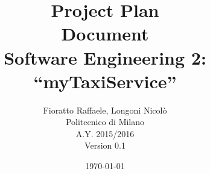 \begin{figure}
  \centering
	\def\svgwidth{\columnwidth}
    \resizebox{0.66\textwidth}{!}{}
\end{figure}
\title{{\Huge \textbf{P}roject \textbf{P}lan \\ \textbf{D}ocument}\\{\Large Software Engineering 2: ``myTaxiService''}}

\author{Fioratto Raffaele, Longoni Nicol\`{o}
\\Politecnico di Milano
\\{\small A.Y. 2015/2016}
\\{\small Version 0.1}}
\date{\today}
\maketitle
\newpage
\tableofcontents
